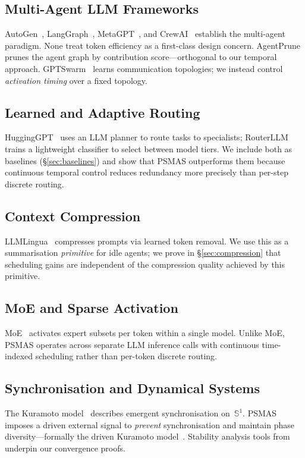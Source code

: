 \documentclass[10pt,twocolumn]{article}
\theoremstyle{plain}
\theoremstyle{definition}
\theoremstyle{remark}
\newcommand{\Sone}{\mathbb{S}^1}
\begin{document}
\subsection{Multi-Agent LLM Frameworks}
AutoGen~\citep{wu2023autogen}, LangGraph~\citep{chase2024langgraph},
MetaGPT~\citep{hong2023metagpt}, and CrewAI~\citep{moura2024crewai}
establish the multi-agent paradigm.  None treat token efficiency as a
first-class design concern.  AgentPrune~\citep{tao2024agentprune}
prunes the agent graph by contribution score---orthogonal to our temporal
approach.  GPTSwarm~\citep{zhuge2024gptswarm} learns communication
topologies; we instead control \emph{activation timing} over a fixed topology.

\subsection{Learned and Adaptive Routing}
HuggingGPT~\citep{shen2024hugginggpt} uses an LLM planner to route
tasks to specialists; RouterLLM~\citep{ong2024routerllm} trains a
lightweight classifier to select between model tiers.  We include both
as baselines (\S\ref{sec:baselines}) and show that PSMAS outperforms
them because continuous temporal control reduces redundancy more precisely
than per-step discrete routing.

\subsection{Context Compression}
LLMLingua~\citep{jiang2024llmlingua} compresses prompts via learned
token removal.  We use this as a summarisation \emph{primitive} for
idle agents; we prove in \S\ref{sec:compression} that scheduling gains
are independent of the compression quality achieved by this primitive.

\subsection{MoE and Sparse Activation}
MoE~\citep{shazeer2017outrageously,fedus2022switch} activates expert
subsets per token within a single model.  Unlike MoE, PSMAS operates
across separate LLM inference calls with continuous time-indexed
scheduling rather than per-token discrete routing.

\subsection{Synchronisation and Dynamical Systems}
The Kuramoto model~\citep{kuramoto1984} describes emergent
synchronisation on~$\Sone$.  PSMAS imposes a driven external signal to
\emph{prevent} synchronisation and maintain phase diversity---formally
the driven Kuramoto model~\citep{acebron2005kuramoto}.  Stability analysis
tools from~\citet{bullo2004geometric} underpin our convergence proofs.
\end{document}
